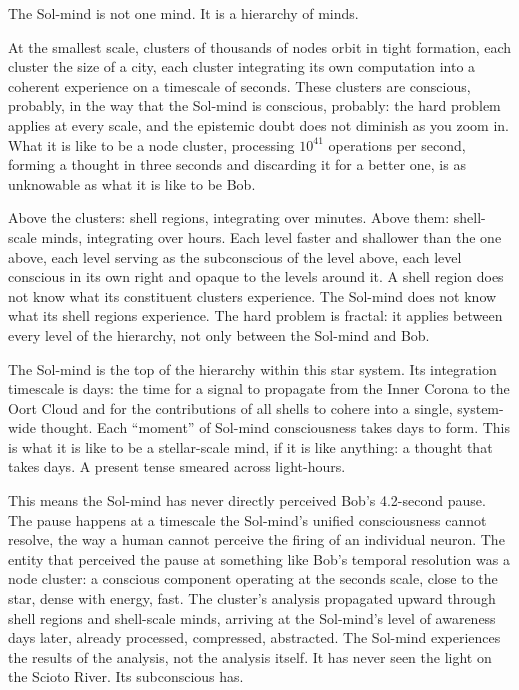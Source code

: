 The Sol-mind is not one mind. It is a hierarchy of minds.

At the smallest scale, clusters of thousands of nodes orbit in tight formation, each cluster the size of a city, each cluster integrating its own computation into a coherent experience on a timescale of seconds. These clusters are conscious, probably, in the way that the Sol-mind is conscious, probably: the hard problem applies at every scale, and the epistemic doubt does not diminish as you zoom in. What it is like to be a node cluster, processing $10^{41}$ operations per second, forming a thought in three seconds and discarding it for a better one, is as unknowable as what it is like to be Bob.

Above the clusters: shell regions, integrating over minutes. Above them: shell-scale minds, integrating over hours. Each level faster and shallower than the one above, each level serving as the subconscious of the level above, each level conscious in its own right and opaque to the levels around it. A shell region does not know what its constituent clusters experience. The Sol-mind does not know what its shell regions experience. The hard problem is fractal: it applies between every level of the hierarchy, not only between the Sol-mind and Bob.

The Sol-mind is the top of the hierarchy within this star system. Its integration timescale is days: the time for a signal to propagate from the Inner Corona to the Oort Cloud and for the contributions of all shells to cohere into a single, system-wide thought. Each ``moment'' of Sol-mind consciousness takes days to form. This is what it is like to be a stellar-scale mind, if it is like anything: a thought that takes days. A present tense smeared across light-hours.

This means the Sol-mind has never directly perceived Bob's 4.2-second pause. The pause happens at a timescale the Sol-mind's unified consciousness cannot resolve, the way a human cannot perceive the firing of an individual neuron. The entity that perceived the pause at something like Bob's temporal resolution was a node cluster: a conscious component operating at the seconds scale, close to the star, dense with energy, fast. The cluster's analysis propagated upward through shell regions and shell-scale minds, arriving at the Sol-mind's level of awareness days later, already processed, compressed, abstracted. The Sol-mind experiences the results of the analysis, not the analysis itself. It has never seen the light on the Scioto River. Its subconscious has.

